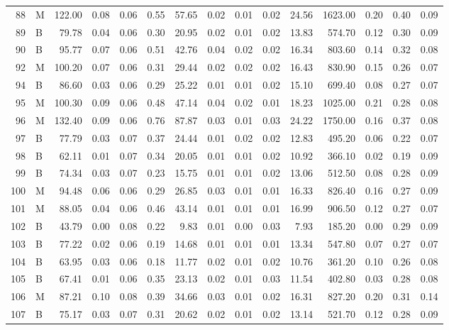 \begin{table}[ht]
\begin{tabular}{rlrrrrrrrrrrrrr}
  88 & M & 122.00 & 0.08 & 0.06 & 0.55 & 57.65 & 0.02 & 0.01 & 0.02 & 24.56 & 1623.00 & 0.20 & 0.40 & 0.09 \\ 
  89 & B & 79.78 & 0.04 & 0.06 & 0.30 & 20.95 & 0.02 & 0.01 & 0.02 & 13.83 & 574.70 & 0.12 & 0.30 & 0.09 \\ 
  90 & B & 95.77 & 0.07 & 0.06 & 0.51 & 42.76 & 0.04 & 0.02 & 0.02 & 16.34 & 803.60 & 0.14 & 0.32 & 0.08 \\ 
  92 & M & 100.20 & 0.07 & 0.06 & 0.31 & 29.44 & 0.02 & 0.02 & 0.02 & 16.43 & 830.90 & 0.15 & 0.26 & 0.07 \\ 
  94 & B & 86.60 & 0.03 & 0.06 & 0.29 & 25.22 & 0.01 & 0.01 & 0.02 & 15.10 & 699.40 & 0.08 & 0.27 & 0.07 \\ 
  95 & M & 100.30 & 0.09 & 0.06 & 0.48 & 47.14 & 0.04 & 0.02 & 0.01 & 18.23 & 1025.00 & 0.21 & 0.28 & 0.08 \\ 
  96 & M & 132.40 & 0.09 & 0.06 & 0.76 & 87.87 & 0.03 & 0.01 & 0.03 & 24.22 & 1750.00 & 0.16 & 0.37 & 0.08 \\ 
  97 & B & 77.79 & 0.03 & 0.07 & 0.37 & 24.44 & 0.01 & 0.02 & 0.02 & 12.83 & 495.20 & 0.06 & 0.22 & 0.07 \\ 
  98 & B & 62.11 & 0.01 & 0.07 & 0.34 & 20.05 & 0.01 & 0.01 & 0.02 & 10.92 & 366.10 & 0.02 & 0.19 & 0.09 \\ 
  99 & B & 74.34 & 0.03 & 0.07 & 0.23 & 15.75 & 0.01 & 0.01 & 0.02 & 13.06 & 512.50 & 0.08 & 0.28 & 0.09 \\ 
  100 & M & 94.48 & 0.06 & 0.06 & 0.29 & 26.85 & 0.03 & 0.01 & 0.01 & 16.33 & 826.40 & 0.16 & 0.27 & 0.09 \\ 
  101 & M & 88.05 & 0.04 & 0.06 & 0.46 & 43.14 & 0.01 & 0.01 & 0.01 & 16.99 & 906.50 & 0.12 & 0.27 & 0.07 \\ 
  102 & B & 43.79 & 0.00 & 0.08 & 0.22 & 9.83 & 0.01 & 0.00 & 0.03 & 7.93 & 185.20 & 0.00 & 0.29 & 0.09 \\ 
  103 & B & 77.22 & 0.02 & 0.06 & 0.19 & 14.68 & 0.01 & 0.01 & 0.01 & 13.34 & 547.80 & 0.07 & 0.27 & 0.07 \\ 
  104 & B & 63.95 & 0.03 & 0.06 & 0.18 & 11.77 & 0.02 & 0.01 & 0.02 & 10.76 & 361.20 & 0.10 & 0.26 & 0.08 \\ 
  105 & B & 67.41 & 0.01 & 0.06 & 0.35 & 23.13 & 0.02 & 0.01 & 0.03 & 11.54 & 402.80 & 0.03 & 0.28 & 0.08 \\ 
  106 & M & 87.21 & 0.10 & 0.08 & 0.39 & 34.66 & 0.03 & 0.01 & 0.02 & 16.31 & 827.20 & 0.20 & 0.31 & 0.14 \\ 
  107 & B & 75.17 & 0.03 & 0.07 & 0.31 & 20.62 & 0.02 & 0.01 & 0.02 & 13.14 & 521.70 & 0.12 & 0.28 & 0.09 \\ 

\end{tabular}
\end{table}
